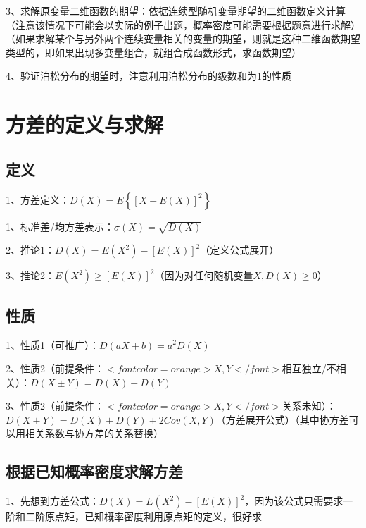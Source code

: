 3、求解原变量二维函数的期望：依据连续型随机变量期望的二维函数定义计算（注意该情况下可能会以实际的例子出题，概率密度可能需要根据题意进行求解）（如果求解某个与另外两个连续变量相关的变量的期望，则就是这种二维函数期望类型的，即如果出现多变量组合，就组合成函数形式，求函数期望）

4、验证泊松分布的期望时，注意利用泊松分布的级数和为1的性质

\section{方差的定义与求解}



\subsection{定义}

1、方差定义：$ D(X)=E\left\{[X-E(X)]^{2}\right\} $

1、标准差/均方差表示：$ \sigma(X)=\sqrt{D(X)} $

2、推论1：$ D(X)=E\left(X^{2}\right)-[E(X)]^{2} $（定义公式展开）

3、推论2：$ E\left(X^{2}\right) \geqslant[E(X)]^{2} $（因为对任何随机变量$ X, D(X) \geqslant 0 $）



\subsection{性质}

1、性质1（可推广）：$ D(a X+b)=a^{2} D(X)  $

2、性质2（前提条件：$ <font color=orange>X,Y</font> $相互独立/不相关）：$ D(X \pm Y)=D(X)+D(Y) $

3、性质2（前提条件：$ <font color=orange>X,Y</font> $关系未知）：$ D ( X \pm Y ) = D ( X ) + D ( Y ) \pm 2 Cov ( X , Y )   $（方差展开公式）（其中协方差可以用相关系数与协方差的关系替换）



\subsection{根据已知概率密度求解方差}

1、先想到方差公式：$ D(X)=E\left(X^{2}\right)-[E(X)]^{2} $，因为该公式只需要求一阶和二阶原点矩，已知概率密度利用原点矩的定义，很好求

